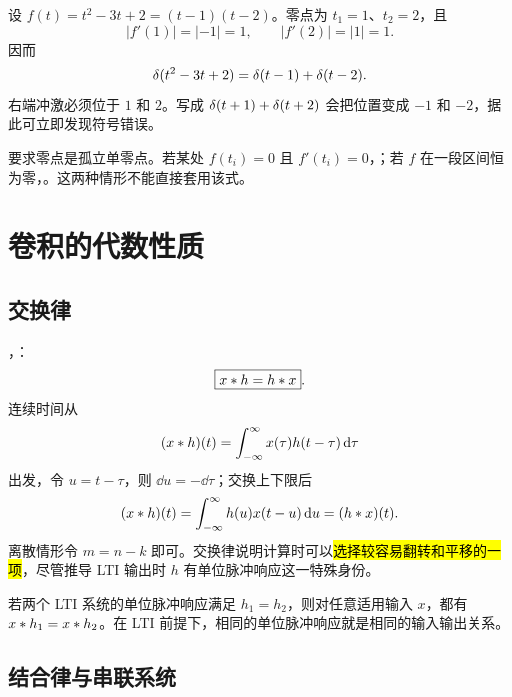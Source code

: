 \begin{example}[二次多项式中的冲激]
  \label{eg:quadratic-composite-impulse}
  设 $f(t)=t^2-3t+2=(t-1)(t-2)$。零点为 $t_1=1$、$t_2=2$，且
  \[
    |f'(1)|=|-1|=1,
    \qquad
    |f'(2)|=|1|=1.
  \]
  因而
  \[
    \delta(t^2-3t+2)=\delta(t-1)+\delta(t-2).
  \]
  右端冲激必须位于 $1$ 和 $2$。写成 $\delta(t+1)+\delta(t+2)$ 会把位置变成 $-1$ 和 $-2$，据此可立即发现符号错误。
\end{example}

\begin{pitfall}[忽略复合冲激公式的条件]
   要求零点是孤立单零点。若某处 $f(t_i)=0$ 且 $f'(t_i)=0$，；若 $f$ 在一段区间恒为零，。这两种情形不能直接套用该式。
\end{pitfall}

\section{卷积的代数性质}
\label{sec:convolution-algebraic-properties}

\subsection{交换律}

，：
\begin{equation}
  \boxed{x\mathbin{\ast} h=h\mathbin{\ast} x}.
  \label{eq:convolution-commutativity}
\end{equation}
连续时间从
\[
  (x\mathbin{\ast} h)(t)
  =\int_{-\infty}^{\infty}x(\tau)h(t-\tau)\mathop{}\!\mathrm{d}\tau
\]
出发，令 $u=t-\tau$，则 $\dd u=-\dd\tau$；交换上下限后
\[
  (x\mathbin{\ast} h)(t)
  =\int_{-\infty}^{\infty}h(u)x(t-u)\mathop{}\!\mathrm{d} u
  =(h\mathbin{\ast} x)(t).
\]
离散情形令 $m=n-k$ 即可。交换律说明计算时可以\hl{选择较容易翻转和平移的一项}，尽管推导 LTI 输出时 $h$ 有单位脉冲响应这一特殊身份。

\begin{remark}
  若两个 LTI 系统的单位脉冲响应满足 $h_1=h_2$，则对任意适用输入 $x$，都有 $x\mathbin{\ast} h_1=x\mathbin{\ast} h_2$。在 LTI 前提下，相同的单位脉冲响应就是相同的输入输出关系。
\end{remark}

\subsection{结合律与串联系统}

